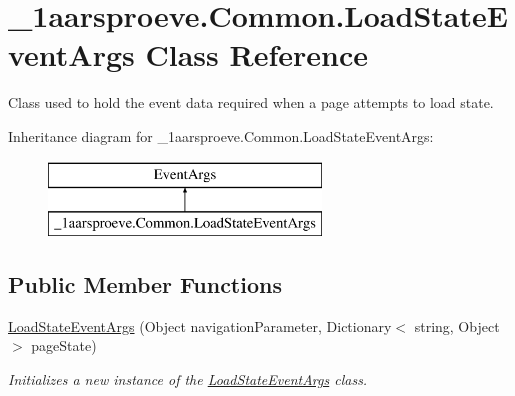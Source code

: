 \hypertarget{class__1aarsproeve_1_1_common_1_1_load_state_event_args}{}\section{\+\_\+1aarsproeve.\+Common.\+Load\+State\+Event\+Args Class Reference}
\label{class__1aarsproeve_1_1_common_1_1_load_state_event_args}


Class used to hold the event data required when a page attempts to load state.  


Inheritance diagram for \+\_\+1aarsproeve.\+Common.\+Load\+State\+Event\+Args\+:\begin{figure}[H]
\begin{center}
\leavevmode
\includegraphics[height=2.000000cm]{class__1aarsproeve_1_1_common_1_1_load_state_event_args}
\end{center}
\end{figure}
\subsection*{Public Member Functions}
\begin{DoxyCompactItemize}
\item 
\hyperlink{class__1aarsproeve_1_1_common_1_1_load_state_event_args_ad17da4db8edeac5f73b571c59c6d0a0f}{Load\+State\+Event\+Args} (Object navigation\+Parameter, Dictionary$<$ string, Object $>$ page\+State)
\begin{DoxyCompactList}\small\item\em Initializes a new instance of the \hyperlink{class__1aarsproeve_1_1_common_1_1_load_state_event_args}{Load\+State\+Event\+Args} class. \end{DoxyCompactList}\end{DoxyCompactItemize}
